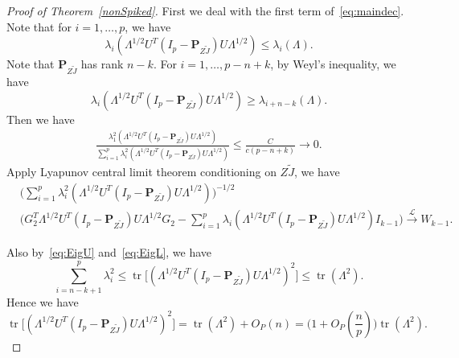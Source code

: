 \documentclass[12pt]{article} %
\DeclareMathOperator{\mytr}{tr}
\newcommand{\bP}{\mathbf{P}}
\theoremstyle{definition}
\begin{document}
\begin{proof}[\textrm{Proof of Theorem~\ref{nonSpiked}}]
    First we deal with the first term of~\eqref{eq:maindec}.
    Note that for $i=1,\ldots, p$, we have 
    \begin{equation}\label{eq:EigU}
    \lambda_i (\Lambda^{1/2}U^T (I_p-\bP_{Z\tilde{J}})U\Lambda^{1/2})\leq
    \lambda_i (\Lambda).
    \end{equation}
    Note that $\bP_{Z\tilde{J}}$ has rank $n-k$. For $i=1,\ldots, p-n+k$, by Weyl's inequality, we have
    \begin{equation}\label{eq:EigL}
    \lambda_i (\Lambda^{1/2}U^T (I_p-\bP_{Z\tilde{J}})U\Lambda^{1/2})\geq
    \lambda_{i+n-k} (\Lambda).
    \end{equation}
Then we have
    $$
    \begin{aligned}
        \frac{\lambda_1^2(\Lambda^{1/2}U^T(I_p-\bP_{Z\tilde{J}})U\Lambda^{1/2})}{\sum_{i=1}^p \lambda_i^2(\Lambda^{1/2}U^T(I_p-\bP_{Z\tilde{J}})U\Lambda^{1/2})}
    \leq
        \frac{C}{c(p-n+k)}\to 0.
    \end{aligned}
    $$
    Apply Lyapunov central limit theorem conditioning on $Z\tilde{J}$, we have
    $$
    \begin{aligned}
        &\Big( \sum_{i=1}^p \lambda_i^2(\Lambda^{1/2}U^T(I_p-\bP_{Z\tilde{J}})U\Lambda^{1/2})\Big)^{-1/2}\\
        &{\Big( G_2^T \Lambda^{1/2}U^T (I_p-\bP_{Z\tilde{J}})U\Lambda^{1/2}G_2-\sum_{i=1}^p \lambda_i(\Lambda^{1/2}U^T(I_p-\bP_{Z\tilde{J}})U\Lambda^{1/2})I_{k-1}\Big)}
    \xrightarrow{\mathcal{L}} W_{k-1}.
    \end{aligned}
    $$

    Also by~\eqref{eq:EigU} and~\eqref{eq:EigL}, we have
    $$
    \sum_{i=n-k+1}^p \lambda_i^2
    \leq
    \mytr\big[(\Lambda^{1/2}U^T (I_p-\bP_{Z\tilde{J}})U\Lambda^{1/2})^2\big]\leq
    \mytr(\Lambda^2).
    $$ 
    Hence we have
    $$
    \mytr\big[(\Lambda^{1/2}U^T (I_p-\bP_{Z\tilde{J}})U\Lambda^{1/2})^2\big]
    =
    \mytr(\Lambda^2)+O_P(n)
    =
    \big(1+O_P(\frac{n}{p})\big)\mytr(\Lambda^2).
    $$ 


\end{proof}
\end{document}
